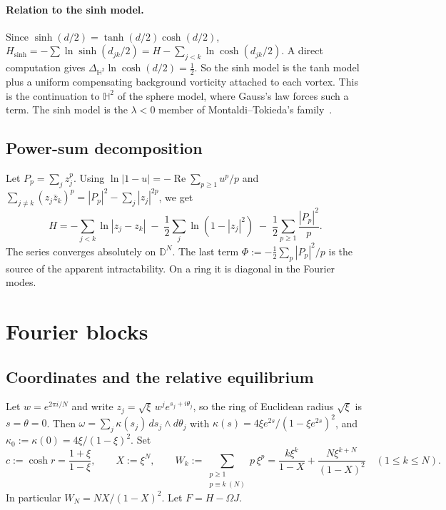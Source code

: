 \documentclass[11pt]{article}
\theoremstyle{remark}
\newcommand{\D}{\mathbb D}
\begin{document}
\paragraph{Relation to the sinh model.} Since $\sinh(d/2)=\tanh(d/2)\cosh(d/2)$,
$H_{\sinh}=-\sum\ln\sinh(d_{jk}/2)=H-\sum_{j<k}\ln\cosh(d_{jk}/2)$. A direct computation gives
$\Delta_{\mathbb H^2}\ln\cosh(d/2)=\frac12$. So the sinh model is the tanh model plus a uniform compensating background
vorticity attached to each vortex. This is the continuation to $\mathbb H^2$ of the sphere model, where Gauss's law forces such a
term. The sinh model is the $\lambda<0$ member of Montaldi--Tokieda's family~\cite[(1.12)]{MT}.

\subsection{Power-sum decomposition}
Let $P_p=\sum_j z_j^p$. Using $\ln|1-u|=-\operatorname{Re}\sum_{p\ge1}u^p/p$ and
$\sum_{j\ne k}(z_j\bar z_k)^p=|P_p|^2-\sum_j|z_j|^{2p}$, we get
\begin{equation}\label{eq:decomp}
H=-\sum_{j<k}\ln|z_j-z_k|\;-\;\frac12\sum_j\ln(1-|z_j|^2)\;-\;\frac12\sum_{p\ge1}\frac{|P_p|^2}{p}.
\end{equation}
The series converges absolutely on $\D^N$. The last term $\Phi:=-\frac12\sum_p|P_p|^2/p$ is the source of the
apparent intractability. On a ring it is diagonal in the Fourier modes.

\section{Fourier blocks}
\subsection{Coordinates and the relative equilibrium}
Let $w=e^{2\pi i/N}$ and write $z_j=\sqrt\xi\,w^j e^{s_j+i\theta_j}$, so the ring of Euclidean radius $\sqrt\xi$ is
$s=\theta=0$. Then $\omega=\sum_j\kappa(s_j)\,ds_j\wedge d\theta_j$ with $\kappa(s)=4\xi e^{2s}/(1-\xi e^{2s})^2$, and
$\kappa_0:=\kappa(0)=4\xi/(1-\xi)^2$. Set
\[
c:=\cosh r=\frac{1+\xi}{1-\xi},\qquad X:=\xi^N,\qquad
W_k:=\sum_{\substack{p\ge1\\ p\equiv k\ (N)}}p\,\xi^p=\frac{k\xi^k}{1-X}+\frac{N\xi^{k+N}}{(1-X)^2}\quad(1\le k\le N).
\]
In particular $W_N=NX/(1-X)^2$. Let $F=H-\Omega J$.
\end{document}

